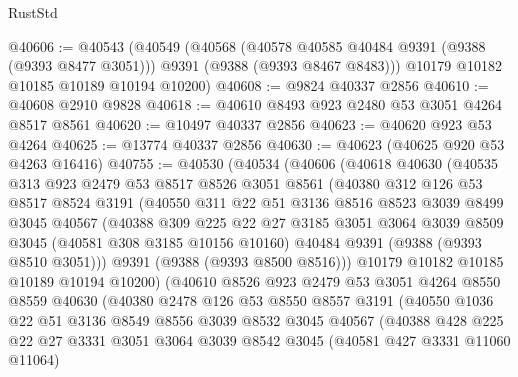 \begin{lexlean}{RustStd}
\begin{coremodule}
@40606 := @40543
    (@40549
      (@40568
        (@40578 @40585 @40484 @9391 (@9388 (@9393 @8477 @3051)))
        @9391
        (@9388 (@9393 @8467 @8483)))
      @10179
      @10182
      @10185
      @10189
      @10194
      @10200)
@40608 := @9824 @40337 @2856
@40610 := @40608 @2910 @9828
@40618 := @40610 @8493 @923 @2480 @53 @3051 @4264 @8517 @8561
@40620 := @10497 @40337 @2856
@40623 := @40620 @923 @53 @4264
@40625 := @13774 @40337 @2856
@40630 := @40623 (@40625 @920 @53 @4263 @16416)
@40755 := @40530
    (@40534
      (@40606
        (@40618
          @40630
          (@40535
            @313
            @923
            @2479
            @53
            @8517
            @8526
            @3051
            @8561
            (@40380
              @312
              @126
              @53
              @8517
              @8524
              @3191
              (@40550
                @311
                @22
                @51
                @3136
                @8516
                @8523
                @3039
                @8499
                @3045
                @40567
                (@40388
                  @309
                  @225
                  @22
                  @27
                  @3185
                  @3051
                  @3064
                  @3039
                  @8509
                  @3045
                  (@40581 @308 @3185 @10156 @10160)
                  @40484
                  @9391
                  (@9388 (@9393 @8510 @3051)))
                @9391
                (@9388 (@9393 @8500 @8516)))
              @10179
              @10182
              @10185
              @10189
              @10194
              @10200)
            (@40610
              @8526
              @923
              @2479
              @53
              @3051
              @4264
              @8550
              @8559
              @40630
              (@40380
                @2478
                @126
                @53
                @8550
                @8557
                @3191
                (@40550
                  @1036
                  @22
                  @51
                  @3136
                  @8549
                  @8556
                  @3039
                  @8532
                  @3045
                  @40567
                  (@40388
                    @428
                    @225
                    @22
                    @27
                    @3331
                    @3051
                    @3064
                    @3039
                    @8542
                    @3045
                    (@40581 @427 @3331 @11060 @11064)

\end{coremodule}
\end{lexlean}
